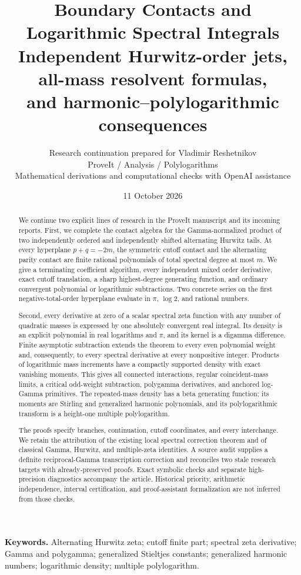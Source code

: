 \documentclass[11pt,letterpaper]{article}
\title{\textbf{Boundary Contacts and\\Logarithmic Spectral Integrals}\\[7pt]
 \large Independent Hurwitz-order jets, all-mass resolvent formulas,\\
 and harmonic--polylogarithmic consequences}
\author{Research continuation prepared for Vladimir Reshetnikov\\
 \small ProveIt / Analysis / Polylogarithms\\
 \small Mathematical derivations and computational checks with OpenAI assistance}
\date{11 October 2026}
\numberwithin{equation}{section}
\theoremstyle{definition}
\theoremstyle{remark}
\begin{document}
\maketitle
\begin{abstract}
We continue two explicit lines of research in the ProveIt manuscript and
its incoming reports. First, we complete the contact algebra for the
Gamma-normalized product of two independently ordered and independently
shifted alternating Hurwitz tails. At every hyperplane \(p+q=-2m\), the
symmetric cutoff contact and the alternating parity contact are finite
rational polynomials of total spectral degree at most \(m\). We give a
terminating coefficient algorithm, every independent mixed order
derivative, exact cutoff translation, a sharp highest-degree generating
function, and ordinary convergent polynomial or logarithmic subtractions.
Two concrete series on the first negative-total-order hyperplane evaluate
in \(\pi\), \(\log 2\), and rational numbers.

Second, every derivative at zero of a scalar spectral zeta function with
any number of quadratic masses is expressed by one absolutely convergent
real integral. Its density is an explicit polynomial in real logarithms
and \(\pi\), and its kernel is a digamma difference. Finite asymptotic subtraction
extends the theorem to every even polynomial weight and, consequently,
to every spectral derivative at every nonpositive integer. Products of logarithmic
mass increments have a compactly supported density with exact vanishing
moments. This gives all connected interactions, regular coincident-mass
limits, a critical odd-weight subtraction, polygamma derivatives, and
anchored log-Gamma primitives. The repeated-mass density has a beta
generating function; its moments are Stirling and generalized harmonic
polynomials, and its polylogarithmic transform is a height-one multiple
polylogarithm.

The proofs specify branches, continuation, cutoff coordinates, and every
interchange. We retain the attribution of the existing local spectral
correction theorem and of classical Gamma, Hurwitz, and multiple-zeta
identities. A source audit supplies a definite reciprocal-Gamma
transcription correction and reconciles two stale research targets with
already-preserved proofs. Exact symbolic checks and separate high-precision
diagnostics accompany the article. Historical priority, arithmetic
independence, interval certification, and proof-assistant formalization are
not inferred from those checks.
\end{abstract}
\noindent\textbf{Keywords.}
Alternating Hurwitz zeta; cutoff finite part; spectral zeta derivative;
Gamma and polygamma; generalized Stieltjes constants; generalized harmonic
numbers; logarithmic density; multiple polylogarithm.
\clearpage
\begingroup
\small
\setlength{\parskip}{0pt}
\tableofcontents
\endgroup
\clearpage
\end{document}
